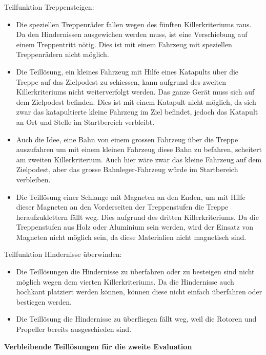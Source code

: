 Teilfunktion Treppensteigen:
\begin{itemize}
    \item Die speziellen Treppenräder fallen wegen des fünften Killerkriteriums raus. Da den Hindernissen ausgewichen werden muss, ist eine Verschiebung auf einem Treppentritt nötig. Dies ist mit einem Fahrzeug mit speziellen Treppenrädern nicht möglich.
    \item Die Teillösung, ein kleines Fahrzeug mit Hilfe eines Katapults über die Treppe auf das Zielpodest zu schiessen, kann aufgrund des zweiten Killerkriteriums nicht weiterverfolgt werden. Das ganze Gerät muss sich auf dem Zielpodest befinden. Dies ist mit einem Katapult nicht möglich, da sich zwar das katapultierte kleine Fahrzeug im Ziel befindet, jedoch das Katapult an Ort und Stelle im Startbereich verbleibt.
    \item Auch die Idee, eine Bahn von einem grossen Fahrzeug über die Treppe auszufahren um mit einem kleinen Fahrzeug diese Bahn zu befahren, scheitert am zweiten Killerkriterium. Auch hier wäre zwar das kleine Fahrzeug auf dem Zielpodest, aber das grosse Bahnleger-Fahrzeug würde im Startbereich verbleiben.
    \item Die Teillösung einer Schlange mit Magneten an den Enden, um mit Hilfe dieser Magneten an den Vorderseiten der Treppenstufen die Treppe heraufzuklettern fällt weg. Dies aufgrund des dritten Killerkriteriums. Da die Treppenstufen aus Holz oder Aluminium sein werden, wird der Einsatz von Magneten nicht möglich sein, da diese Materialien nicht magnetisch sind.
\end{itemize}

Teilfunktion Hindernisse überwinden:
\begin{itemize}
    \item Die Teillösungen die Hindernisse zu überfahren oder zu besteigen sind nicht möglich wegen dem vierten Killerkriteriums. Da die Hindernisse auch hochkant platziert werden können, können diese nicht einfach überfahren oder bestiegen werden.
    \item Die Teillösung die Hindernisse zu überfliegen fällt weg, weil die Rotoren und Propeller bereits ausgeschieden sind.
 \end{itemize}

\textbf{Verbleibende Teillösungen für die zweite Evaluation}

